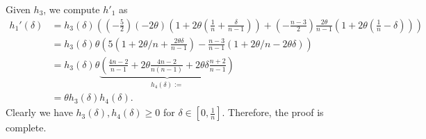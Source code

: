  Given $h_3$, we compute $h'_1$ as 
 \begin{align*}
 h_1'(\delta) &= h_3(\delta)\left(\left(-\frac{5}{2}\right)\left(-2\theta\right)\left(1+2\theta\left(\frac{1}{n}+\frac{\delta}{n-1}\right)\right) + \left(-\frac{n-3}{2}\right)\frac{2\theta}{n-1}\left(1+2\theta\left(\frac{1}{n}-\delta\right)\right)\right)\\
 &= h_3(\delta)\theta\left(5(1+2\theta/n+\frac{2\theta\delta}{n-1}) - \frac{n-3}{n-1}(1+2\theta/n-2\theta\delta)\right)\\
 &=h_3(\delta)\theta\underbrace{\left(\frac{4n-2}{n-1}+2\theta\frac{4n-2}{n(n-1)}+2\theta\delta\frac{n+2}{n-1}\right)}_{h_4(\delta):=}\\
 &=\theta h_3(\delta) h_4(\delta).
 \end{align*}
 Clearly we have $h_3(\delta),h_4(\delta)\ge 0$ for $\delta \in [0,\frac{1}{n}]$. Therefore, the proof is complete.  
 
